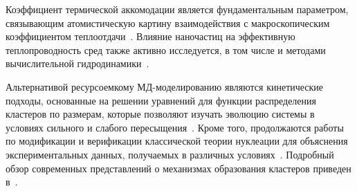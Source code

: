 Коэффициент термической аккомодации является фундаментальным параметром, связывающим атомистическую картину взаимодействия с макроскопическим коэффициентом теплоотдачи~\cite{kurganov_thermal_2016, minakov_thermal_2015, popov_thermal_2016, valueva_nummodelling_2014}. Влияние наночастиц на эффективную теплопроводность сред также активно исследуется, в том числе и методами вычислительной гидродинамики~\cite{timofeeva_particle_2010}.

Альтернативой ресурсоемкому МД-моделированию являются кинетические подходы, основанные на решении уравнений для функции распределения кластеров по размерам, которые позволяют изучать эволюцию системы в условиях сильного и слабого пересыщения~\cite{goncharov_modelling_2011}. Кроме того, продолжаются работы по модификации и верификации классической теории нуклеации для объяснения экспериментальных данных, получаемых в различных условиях~\cite{fisenko_microstructure_2013}. Подробный обзор современных представлений о механизмах образования кластеров приведен в~\cite{varaksin_clusterization_2014}.





